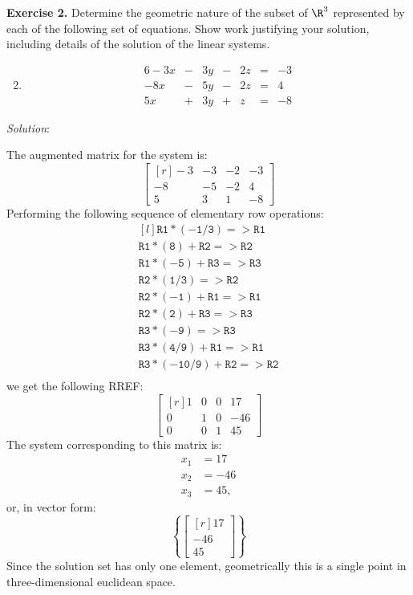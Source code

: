 \documentclass[12pt]{article}
\begin{document}
\textbf{Exercise 2.} Determine the geometric nature of the subset of $\R^3$ represented by each of the following set of equations. Show work justifying your solution, including details of the solution of the linear systems.

\begin{enumerate}
\setcounter{enumi}{1}
\item 
\begin{alignat*}{6}
-3x &{}-{}& 3y &{}-{}& 2z &{}={}& -3\\
-8x &{}-{}& 5y &{}-{}& 2z &{}={}&  4\\
 5x &{}+{}& 3y &{}+{}&  z &{}={}& -8
\end{alignat*}
\end{enumerate}

\emph{Solution}:

The augmented matrix for the system is:
\[
\left[\begin{matrix*}[r]-3 & -3 & -2 & -3\\-8 & -5 & -2 & 4\\5 & 3 & 1 & -8\end{matrix*}\right]
\]
Performing the following sequence of elementary row operations:
\[
\begin{matrix*}[l]
\mathtt{R1*(-1/3)=>R1}\\
\mathtt{R1*(8)+R2=>R2}\\
\mathtt{R1*(-5)+R3=>R3}\\
\mathtt{R2*(1/3)=>R2}\\
\mathtt{R2*(-1)+R1=>R1}\\
\mathtt{R2*(2)+R3=>R3}\\
\mathtt{R3*(-9)=>R3}\\
\mathtt{R3*(4/9)+R1=>R1}\\
\mathtt{R3*(-10/9)+R2=>R2}\\
\end{matrix*}
\]
we get the following RREF:
\[
\left[\begin{matrix*}[r]1 & 0 & 0 & 17\\0 & 1 & 0 & -46\\0 & 0 & 1 & 45\end{matrix*}\right]
\]
The system corresponding to this matrix is:
\begin{align*}
x_1&=17\\
x_2&=-46\\
x_3&=45,
\end{align*}
or, in vector form:
\[
\left\{
\begin{bmatrix*}[r] 17\\-46\\45\end{bmatrix*}
\right\}
\]
Since the solution set has only one element, geometrically this is a single point in three-dimensional euclidean space.
\proofend
\end{document}

